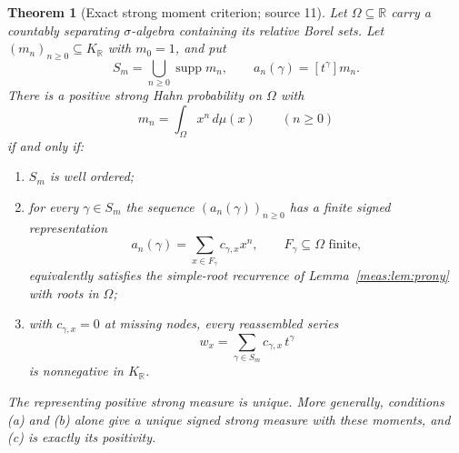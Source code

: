 \documentclass[11pt]{article}
\numberwithin{equation}{section}
\newtheorem{theorem}{Theorem}[section]
\theoremstyle{definition}
\theoremstyle{remark}
\newcommand{\R}{\mathbb R}
\newcommand{\KR}{K_{\R}}
\newcommand{\supp}{\operatorname{supp}}
\newcommand{\coef}[2]{[t^{#1}]#2}
\begin{document}
\begin{theorem}[Exact strong moment criterion; source 11]
\label{meas:thm:momentcriterion}
Let $\Omega\subseteq\R$ carry a countably separating $\sigma$-algebra containing
its relative Borel sets. Let $(m_n)_{n\ge0}\subseteq\KR$ with $m_0=1$, and put
\[
 S_m=\bigcup_{n\ge0}\supp m_n,\qquad a_n(\gamma)=\coef{\gamma}{m_n}.
\]
There is a positive strong Hahn probability on $\Omega$ with
\begin{equation}\label{meas:eq:momentrep}
 m_n=\int_\Omega x^n\,d\mu(x)\qquad(n\ge0)
\end{equation}
if and only if:
\begin{enumerate}[label=(\alph*)]
\item $S_m$ is well ordered;
\item for every $\gamma\in S_m$ the sequence $(a_n(\gamma))_{n\ge0}$ has a finite
signed representation
\begin{equation}\label{meas:eq:rows}
 a_n(\gamma)=\sum_{x\in F_\gamma}c_{\gamma,x}x^n,\qquad F_\gamma\subseteq\Omega\text{ finite},
\end{equation}
equivalently satisfies the simple-root recurrence of
Lemma~\ref{meas:lem:prony} with roots in $\Omega$;
\item with $c_{\gamma,x}=0$ at missing nodes, every reassembled series
\begin{equation}\label{meas:eq:reassemble}
 w_x=\sum_{\gamma\in S_m}c_{\gamma,x}\,t^\gamma
\end{equation}
is nonnegative in $\KR$.
\end{enumerate}
The representing positive strong measure is unique. More generally,
conditions (a) and (b) alone give a unique \emph{signed} strong measure with
these moments, and (c) is exactly its positivity.
\end{theorem}
\end{document}
